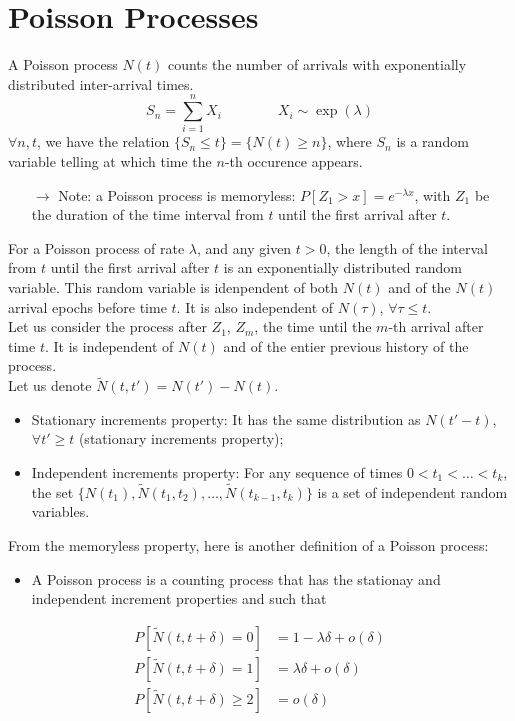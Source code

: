 \documentclass[12pt, openany]{report}
\theoremstyle{definition}
\begin{document}
\chapter{Poisson Processes}\label{chap:poisson}
A Poisson process $N(t)$ counts the number of arrivals with exponentially distributed inter-arrival times. 
\begin{equation}
  S_n = \sum_{i=1}^n X_i \qquad \qquad X_i \sim \exp(\lambda)
\end{equation}
$\forall n,t$, we have the relation $\{S_n\le t\}=\{N(t)\ge n\}$, where $S_n$ is a random variable telling at which time the $n$-th occurence appears.\\
\begin{itemize}
  \item [$\rightarrow$] Note: a Poisson process is memoryless: $P[Z_1>x]=e^{-\lambda x}$, with $Z_1$ be the duration of the time interval from $t$ until the first arrival after $t$.
\end{itemize}
For a Poisson process of rate $\lambda$, and any given $t>0$, the length of the interval from $t$ until the first arrival after $t$ is an exponentially distributed random variable. This random variable is idenpendent of both $N(t)$ and of the $N(t)$ arrival epochs before time $t$. It is also independent of $N(\tau)$, $\forall \tau \le t$.\\

Let us consider the process after $Z_1$, $Z_m$, the time until the $m$-th arrival after time $t$. It is independent of $N(t)$ and of the entier previous history of the process.\\
Let us denote $\tilde N(t,t') = N(t')-N(t)$. 
\begin{itemize}
  \item Stationary increments property: It has the same distribution as $N(t'-t)$, $\forall t'\ge t$ (stationary increments property);
  \item Independent increments property: For any sequence of times $0<t_1<\dots<t_k$, the set $\{N(t_1), \tilde N(t_1,t_2), \dots,\tilde N (t_{k-1}, t_k)\}$ is a set of independent random variables.
\end{itemize}
From the memoryless property, here is another definition of a Poisson process: \\
\begin{itemize}
  \item A Poisson process is a counting process that has the stationay and independent increment properties and such that 
\end{itemize}
\begin{equation}
  \begin{aligned}
    P[\tilde N(t, t+\delta)=0] &= 1-\lambda \delta +o(\delta)\\  P[\tilde N(t, t+\delta)=1] &= \lambda \delta +o(\delta)\\
    P[\tilde N(t, t+\delta)\ge2] &= o(\delta)
  \end{aligned}
\end{equation}
\end{document}
